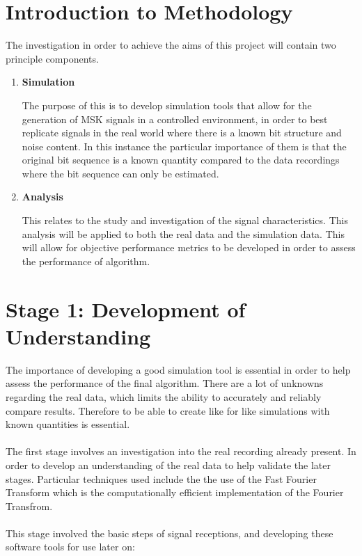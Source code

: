 \section{Introduction to Methodology}
The investigation in order to achieve the aims of this project will contain two principle components. 
\begin{enumerate}
    \item \textbf{Simulation}
    
    The purpose of this is to develop simulation tools that allow for the generation of MSK signals in a controlled environment, in order to best replicate signals in the real world where there is a known bit structure and noise content. In this instance the particular importance of them is that the original bit sequence is a known quantity compared to the data recordings where the bit sequence can only be estimated. 
    
    \item \textbf{Analysis}
    
    This relates to the study and investigation of the signal characteristics. This analysis will be applied to both the real data and the simulation data. This will allow for objective performance metrics to be developed in order to assess the performance of algorithm.
\end{enumerate}


\section{Stage 1: Development of Understanding} 
The importance of developing a good simulation tool is essential in order to help assess the performance of the final algorithm. There are a lot of unknowns regarding the real data, which limits the ability to accurately and reliably compare results. Therefore to be able to create like for like simulations with known quantities is essential.
\\\\
The first stage involves an investigation into the real recording already present. In order to develop an understanding of the real data to help validate the later stages. Particular techniques used include the the use of the Fast Fourier Transform which is the computationally efficient implementation of the Fourier Transfrom.
\\\\
This stage involved the basic steps of signal receptions, and developing these software tools for use later on:

